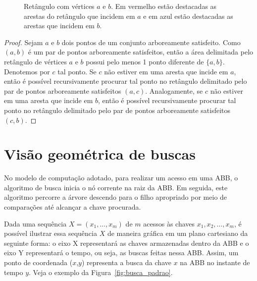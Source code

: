 \begin{figure}
    \caption{Retângulo com vértices $a$ e $b$. Em vermelho estão destacadas as arestas do retângulo que incidem em $a$ e em azul estão destacadas as arestas que incidem em $b$.}
\end{figure}

\begin{proof} Sejam $a$ e $b$ dois pontos de um conjunto arboreamente satisfeito. Como $(a,b)$ é um par de pontos arboreamente satisfeitos, então a área delimitada pelo retângulo de vértices $a$ e $b$ possui pelo menos 1 ponto diferente de $\{a,b\}$. Denotemos por $c$ tal ponto. Se $c$ não estiver em uma aresta que incide em $a$, então é possível recursivamente procurar tal ponto no retângulo delimitado pelo par de pontos arboreamente satisfeitos $(a,c)$. Analogamente, se $c$ não estiver em uma aresta que incide em $b$, então é possível recursivamente procurar tal ponto no retângulo delimitado pelo par de pontos arboreamente satisfeitos $(c,b)$.
\end{proof}


\section{Visão geométrica de buscas}

No modelo de computação adotado, para realizar um acesso em uma ABB, o algoritmo de busca inicia o nó corrente na raiz da ABB. Em seguida, este algoritmo percorre a árvore descendo para o filho apropriado por meio de comparações até alcançar a chave procurada.

Dada uma sequência $X = (x_{1},\ldots,x_{m})$ de $m$ acessos às chaves $x_{1}, x_{2},\ldots,x_{m}$, é possível ilustrar essa sequência $X$ de maneira gráfica em um plano cartesiano da seguinte forma: o eixo X representará as chaves armazenadas dentro da ABB e o eixo Y representará o tempo, ou seja, as buscas feitas nessa ABB. Assim, um ponto de coordenada ($x$,$y$) representa a busca da chave $x$ na ABB no instante de tempo $y$. Veja o exemplo da Figura~\ref{fig:busca_padrao}.

